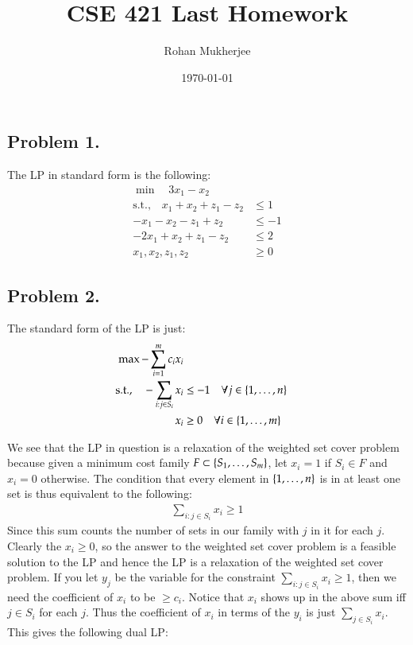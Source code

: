 \documentclass[12pt]{article}
\title{CSE 421 Last Homework}
\date{\today}
\author{Rohan Mukherjee}
\theoremstyle{definitionstyle}
\newcommand{\SET}[1]{\Set{\mskip-\medmuskip #1 \mskip-\medmuskip}}
\begin{document}
    \maketitle
    \subsection*{Problem 1.}
    The LP in standard form is the following:
    \begin{align*}
        \min \quad  3x_1 - x_2 \\
        \text{s.t.,} \quad x_1+x_2+z_1 - z_2 &\leq 1 \\
        -x_1-x_2-z_1+z_2 &\leq -1 \\
        -2x_1 + x_2 + z_1 - z_2 &\leq 2 \\
        x_1, x_2, z_1, z_2 &\geq 0
    \end{align*}

    \subsection*{Problem 2.}

    The standard form of the LP is just:
    \begin{align*}
        \max -\sum_{i=1}^m c_ix_i \\ 
        \text{s.t.,} \quad -\sum_{i: j \in S_i} x_i & \leq -1 \quad \forall j \in \SET{1, \ldots, n} \\
        x_i &\geq 0 \quad \forall i \in \SET{1, \ldots, m}
    \end{align*}

    We see that the LP in question is a relaxation of the weighted set cover problem because given a minimum cost family $F \subset \SET{S_1, \ldots, S_m}$, let $x_i = 1$ if $S_i \in F$ and $x_i = 0$ otherwise. The condition that every element in $\SET{1, \ldots, n}$ is in at least one set is thus equivalent to the following:
    \begin{align*}
        \sum_{i : j \in S_i} x_i \geq 1
    \end{align*}
    Since this sum counts the number of sets in our family with $j$ in it for each $j$. Clearly the $x_i \geq 0$, so the answer to the weighted set cover problem is a feasible solution to the LP and hence the LP is a relaxation of the weighted set cover problem. If you let $y_j$ be the variable for the constraint $\sum_{i: j \in S_i} x_i \geq 1$, then we need the coefficient of $x_i$ to be $\geq c_i$. Notice that $x_i$ shows up in the above sum iff $j \in S_i$ for each $j$. Thus the coefficient of $x_i$ in terms of the $y_i$ is just $\sum_{j \in S_i} x_i$. This gives the following dual LP:
\end{document}
